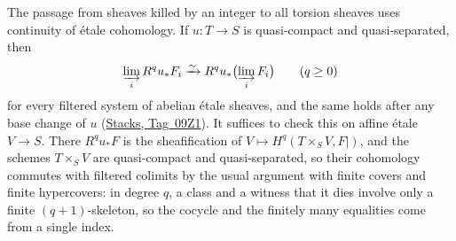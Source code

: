 \documentclass[11pt,a4paper]{article}
\numberwithin{equation}{section}
\theoremstyle{definition}
\theoremstyle{remark}
\newcommand{\stacks}[1]{\href{https://stacks.math.columbia.edu/tag/#1}{\textnormal{Stacks, Tag~#1}}}
\begin{document}
The passage from sheaves killed by an integer to all torsion sheaves
uses continuity of \'etale cohomology. If $u:T\to S$ is quasi-compact
and quasi-separated, then
\begin{equation}\label{pbc:filtered-colimits}
 \varinjlim_i R^qu_*F_i\xrightarrow{\sim}
 R^qu_*\bigl(\varinjlim_i F_i\bigr)\qquad(q\geq0)
\end{equation}
for every filtered system of abelian \'etale sheaves, and the same
holds after any base change of $u$ (\stacks{09Z1}). It suffices to
check this on affine \'etale $V\to S$. There $R^qu_*F$ is the
sheafification of $V\mapsto H^q(T\times_SV,F|)$, and the schemes
$T\times_SV$ are quasi-compact and quasi-separated, so their
cohomology commutes with filtered colimits by the usual argument with
finite covers and finite hypercovers: in degree $q$, a class and a
witness that it dies involve only a finite $(q+1)$-skeleton, so the
cocycle and the finitely many equalities come from a single index.
\end{document}

